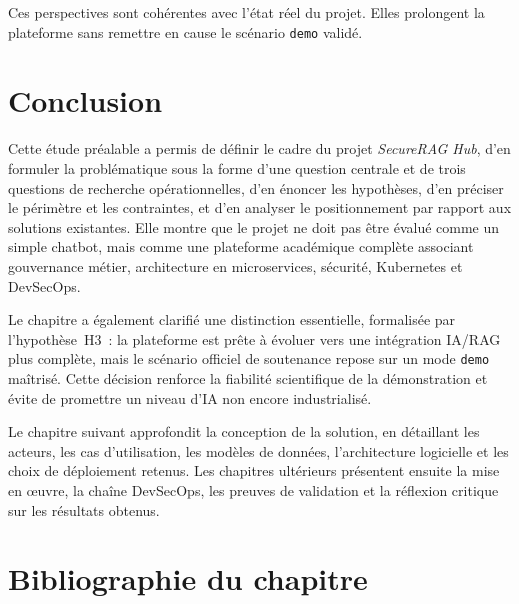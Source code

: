Ces perspectives sont cohérentes avec l'état réel du projet. Elles prolongent la plateforme sans remettre en cause le scénario \texttt{demo} validé.

\section{Conclusion}

Cette étude préalable a permis de définir le cadre du projet \textit{SecureRAG Hub}, d'en formuler la problématique sous la forme d'une question centrale et de trois questions de recherche opérationnelles, d'en énoncer les hypothèses, d'en préciser le périmètre et les contraintes, et d'en analyser le positionnement par rapport aux solutions existantes. Elle montre que le projet ne doit pas être évalué comme un simple chatbot, mais comme une plateforme académique complète associant gouvernance métier, architecture en microservices, sécurité, Kubernetes et DevSecOps.

Le chapitre a également clarifié une distinction essentielle, formalisée par l'hypothèse~H3~: la plateforme est prête à évoluer vers une intégration IA/RAG plus complète, mais le scénario officiel de soutenance repose sur un mode \texttt{demo} maîtrisé. Cette décision renforce la fiabilité scientifique de la démonstration et évite de promettre un niveau d'IA non encore industrialisé.

Le chapitre suivant approfondit la conception de la solution, en détaillant les acteurs, les cas d'utilisation, les modèles de données, l'architecture logicielle et les choix de déploiement retenus. Les chapitres ultérieurs présentent ensuite la mise en œuvre, la chaîne DevSecOps, les preuves de validation et la réflexion critique sur les résultats obtenus.

\section*{Bibliographie du chapitre}

